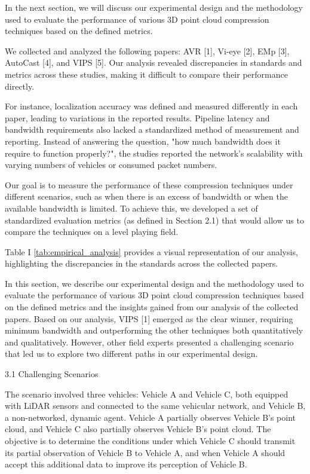 \documentclass[conference]{IEEEtran}
\begin{document}
In the next section, we will discuss our experimental design and the methodology used to evaluate the performance of various 3D point cloud compression techniques based on the defined metrics.

We collected and analyzed the following papers: AVR [1], Vi-eye [2], EMp [3], AutoCast [4], and VIPS [5]. Our analysis revealed discrepancies in standards and metrics across these studies, making it difficult to compare their performance directly.

For instance, localization accuracy was defined and measured differently in each paper, leading to variations in the reported results. Pipeline latency and bandwidth requirements also lacked a standardized method of measurement and reporting. Instead of answering the question, "how much bandwidth does it require to function properly?", the studies reported the network's scalability with varying numbers of vehicles or consumed packet numbers.

Our goal is to measure the performance of these compression techniques under different scenarios, such as when there is an excess of bandwidth or when the available bandwidth is limited. To achieve this, we developed a set of standardized evaluation metrics (as defined in Section 2.1) that would allow us to compare the techniques on a level playing field.

Table I \ref{tab:empirical_analysis} provides a visual representation of our analysis, highlighting the discrepancies in the standards across the collected papers.

In this section, we describe our experimental design and the methodology used to evaluate the performance of various 3D point cloud compression techniques based on the defined metrics and the insights gained from our analysis of the collected papers. Based on our analysis, VIPS [1] emerged as the clear winner, requiring minimum bandwidth and outperforming the other techniques both quantitatively and qualitatively. However, other field experts presented a challenging scenario that led us to explore two different paths in our experimental design.

3.1 Challenging Scenarios

The scenario involved three vehicles: Vehicle A and Vehicle C, both equipped with LiDAR sensors and connected to the same vehicular network, and Vehicle B, a non-networked, dynamic agent. Vehicle A partially observes Vehicle B's point cloud, and Vehicle C also partially observes Vehicle B's point cloud. The objective is to determine the conditions under which Vehicle C should transmit its partial observation of Vehicle B to Vehicle A, and when Vehicle A should accept this additional data to improve its perception of Vehicle B.
\end{document}
